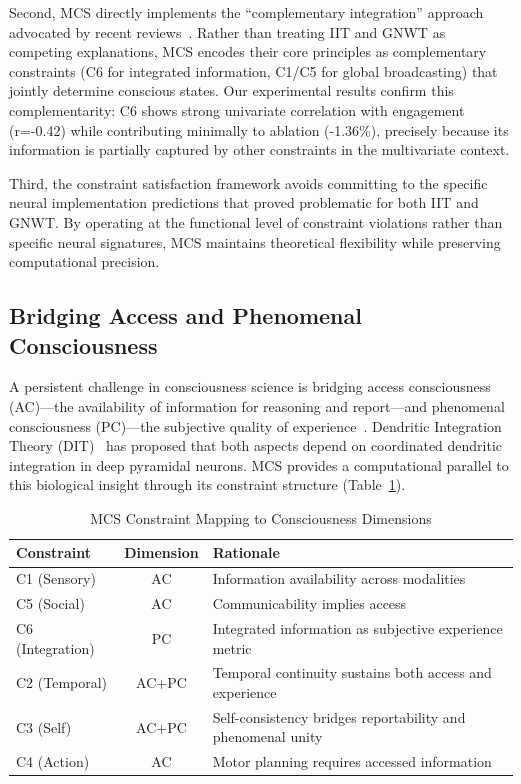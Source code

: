 \documentclass[10pt,journal,compsoc]{IEEEtran}
\begin{document}
Second, MCS directly implements the ``complementary integration'' approach advocated by recent reviews~\cite{Storm2024}. Rather than treating IIT and GNWT as competing explanations, MCS encodes their core principles as complementary constraints (C6 for integrated information, C1/C5 for global broadcasting) that jointly determine conscious states. Our experimental results confirm this complementarity: C6 shows strong univariate correlation with engagement (r=-0.42) while contributing minimally to ablation (-1.36\%), precisely because its information is partially captured by other constraints in the multivariate context.

Third, the constraint satisfaction framework avoids committing to the specific neural implementation predictions that proved problematic for both IIT and GNWT. By operating at the functional level of constraint violations rather than specific neural signatures, MCS maintains theoretical flexibility while preserving computational precision.

\subsection{Bridging Access and Phenomenal Consciousness}

A persistent challenge in consciousness science is bridging access consciousness (AC)—the availability of information for reasoning and report—and phenomenal consciousness (PC)—the subjective quality of experience~\cite{Storm2024}. Dendritic Integration Theory (DIT)~\cite{Bachmann2020, Aru2020} has proposed that both aspects depend on coordinated dendritic integration in deep pyramidal neurons. MCS provides a computational parallel to this biological insight through its constraint structure (Table~\ref{tab:ac_pc_mapping}).

\begin{table}[!t]
\renewcommand{\arraystretch}{1.3}
\caption{MCS Constraint Mapping to Consciousness Dimensions}
\label{tab:ac_pc_mapping}
\centering
\begin{tabular}{lcp{1.8in}}
\toprule
\textbf{Constraint} & \textbf{Dimension} & \textbf{Rationale} \\
\midrule
C1 (Sensory) & AC & Information availability across modalities \\
C5 (Social) & AC & Communicability implies access \\
C6 (Integration) & PC & Integrated information as subjective experience metric \\
C2 (Temporal) & AC+PC & Temporal continuity sustains both access and experience \\
C3 (Self) & AC+PC & Self-consistency bridges reportability and phenomenal unity \\
C4 (Action) & AC & Motor planning requires accessed information \\
\bottomrule
\end{tabular}
\end{table}
\end{document}
